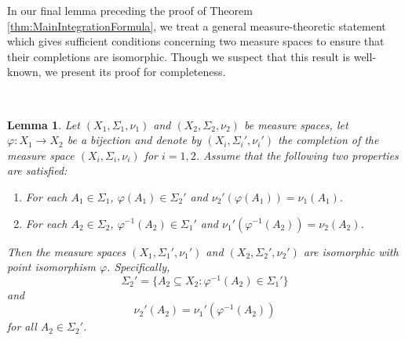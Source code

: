 \documentclass[11pt]{article}
\newtheorem{lemma}[theorem]{Lemma}
\begin{document}

\noindent In our final lemma preceding the proof of Theorem \ref{thm:MainIntegrationFormula}, we treat a general measure-theoretic statement which gives sufficient conditions concerning two measure spaces to ensure that their completions are isomorphic. Though we suspect that this result is well-known, we present its proof for completeness.

\
\begin{lemma}\label{lem:PushforwardLemma}
Let $(X_1,\Sigma_1,\nu_1)$ and $(X_2,\Sigma_2,\nu_2)$ be measure spaces, let $\varphi:X_1\to X_2$ be a bijection and denote by $(X_i,\Sigma_i',\nu_i')$ the completion of the measure space $(X_i,\Sigma_i,\nu_i)$ for $i=1,2$. Assume that the following two properties are satisfied:
\begin{enumerate}
\item\label{property:PushforwardLemma1} For each $A_1\in\Sigma_1$, $\varphi(A_1)\in\Sigma_2'$ and $\nu_2'(\varphi(A_1))=\nu_1(A_1).$
\item\label{property:PushforwardLemma2} For each $A_2\in\Sigma_2$, $\varphi^{-1}(A_2)\in \Sigma_1'$ and $\nu_1'(\varphi^{-1}(A_2))=\nu_2(A_2)$.
\end{enumerate}
Then the measure spaces $(X_1,\Sigma_1',\nu_1')$ and $(X_2,\Sigma_2',\nu_2')$ are isomorphic with point isomorphism $\varphi$. Specifically,
\begin{equation}\label{eq:PushforwardLemma1}
\Sigma_2'=\{A_2\subseteq X_2: \varphi^{-1}(A_2)\in\Sigma_1'\}
\end{equation}
and
\begin{equation}\label{eq:PushforwardLemma2}
\nu_2'(A_2)=\nu_1'(\varphi^{-1}(A_2))
\end{equation}
for all $A_2\in\Sigma_2'$.
\end{lemma}
\end{document}
